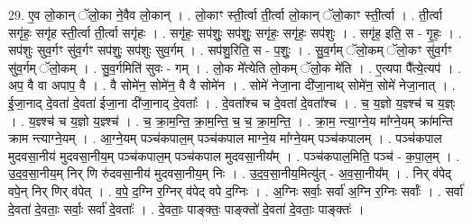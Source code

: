 \documentclass[17pt]{extarticle}
\begin{document}
29. ए॒व लो॒कान् ॅलो॒का ने॒वैव लो॒कान् । . लो॒काꣳ स्ती॒र्त्वा ती॒र्त्वा लो॒कान् ॅलो॒काꣳ स्ती॒र्त्वा । . ती॒र्त्वा सगृ॑हः॒ सगृ॑ह स्ती॒र्त्वा ती॒र्त्वा सगृ॑हः । . सगृ॑हः॒ सप॑शुः॒ सप॑शुः॒ सगृ॑हः॒ सगृ॑हः॒ सप॑शुः । . सगृ॑ह॒ इति॒ स - गृ॒हः॒ । . सप॑शुः सुव॒र्गꣳ सु॑व॒र्गꣳ सप॑शुः॒ सप॑शुः सुव॒र्गम् । . सप॑शु॒रिति॒ स - प॒शुः॒ । . सु॒व॒र्गम् ॅलो॒कम् ॅलो॒कꣳ सु॑व॒र्गꣳ सु॑व॒र्गम् ॅलो॒कम् । . सु॒व॒र्गमिति॑ सुवः - गम् । . लो॒क मे᳚त्येति लो॒कम् ॅलो॒क मे॑ति । . ए॒त्यपा पै᳚त्ये॒त्यप॑ । . अप॒ वै वा अपाप॒ वै । . वै सोमे॑न॒ सोमे॑न॒ वै वै सोमे॑न । . सोमे॑ नेजा॒ना दी॑जा॒नाथ् सोमे॑न॒ सोमे॑ नेजा॒नात् । . ई॒जा॒नाद् दे॒वता॑ दे॒वता॑ ईजा॒ना दी॑जा॒नाद् दे॒वताः᳚ । . दे॒वता᳚श्च च दे॒वता॑ दे॒वता᳚श्च । . च॒ य॒ज्ञो य॒ज्ञ्श्च॑ च य॒ज्ञ्ः । . य॒ज्ञ्श्च॑ च य॒ज्ञो य॒ज्ञ्श्च॑ । . च॒ क्रा॒म॒न्ति॒ क्रा॒म॒न्ति॒ च॒ च॒ क्रा॒म॒न्ति॒ । . क्रा॒म॒ न्त्या॒ग्ने॒य मा᳚ग्ने॒यम् क्रा॑मन्ति क्राम न्त्याग्ने॒यम् । . आ॒ग्ने॒यम् पञ्च॑कपाल॒म् पञ्च॑कपाल माग्ने॒य मा᳚ग्ने॒यम् पञ्च॑कपालम् । . पञ्च॑कपाल मुदवसा॒नीय॑ मुदवसा॒नीय॒म् पञ्च॑कपाल॒म् पञ्च॑कपाल मुदवसा॒नीय᳚म् । . पञ्च॑कपाल॒मिति॒ पञ्च॑ - क॒पा॒ल॒म् । . उ॒द॒व॒सा॒नीय॒म् निर् णि रु॑दवसा॒नीय॑ मुदवसा॒नीय॒म् निः । . उ॒द॒व॒सा॒नीय॒मित्यु॑त् - अ॒व॒सा॒नीय᳚म् । . निर् व॑पेद् वपे॒न् निर् णिर् व॑पेत् । . व॒पे॒ द॒ग्नि र॒ग्निर् व॑पेद् वपे द॒ग्निः । . अ॒ग्निः सर्वाः॒ सर्वा॑ अ॒ग्नि र॒ग्निः सर्वाः᳚ । . सर्वा॑ दे॒वता॑ दे॒वताः॒ सर्वाः॒ सर्वा॑ दे॒वताः᳚ । . दे॒वताः॒ पाङ्क्तः॒ पाङ्क्तो॑ दे॒वता॑ दे॒वताः॒ पाङ्क्तः॑ । \newline
\end{document}
